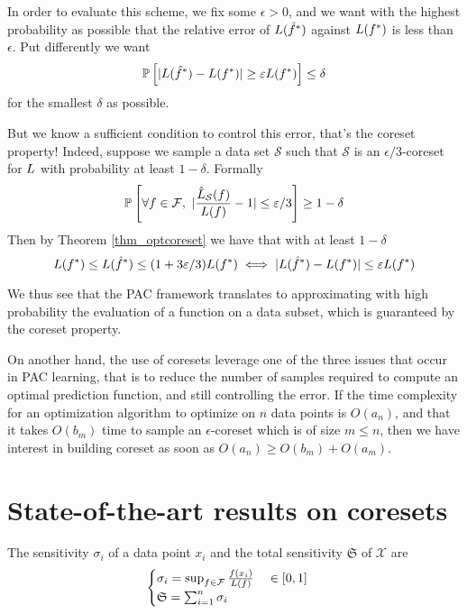 In order to evaluate this scheme, we fix some $\epsilon>0$, and we want with the highest probability as possible that the relative error of $L(\hat {f}^*)$ against $L(f^*)$ is less than $\epsilon$. Put differently we want
\begin{equation*}
	\mathbb{P}\left[|L(\hat {f}^*) - L(f^*)| \ge \varepsilon L(f^*)\right] \leq \delta
\end{equation*}
for the smallest $\delta$ as possible.

But we know a sufficient condition to control this error, that's the coreset property! Indeed, suppose we sample a data set $\mathcal{S}$ such that $\mathcal{S}$ is an $\epsilon/3$-coreset for $L$ with probability at least $1-\delta$. Formally
\begin{equation*}
    \PPP{}{\forall f \in \queryset,\ |\frac{\estloss{\mathcal{S}}(\query)}{\loss(\query)} - 1| \leq \epsilon/3} \geq 1- \delta
\end{equation*}
Then by Theorem \ref{thm_optcoreset} we have that with at least $1-\delta$
\begin{equation*}
    L(f^*) \leq L(\hat {f}^*) \leq (1+ 3 \varepsilon/3) L(f^*) \iff
    |L(\hat {f}^*) - L(f^*)| \leq \varepsilon L(f^*)
\end{equation*}

We thus see that the PAC framework translates to approximating with high probability the evaluation of a function on a data subset, which is guaranteed by the coreset property. 

On another hand, the use of coresets leverage one of the three issues that occur in PAC learning, that is to reduce the number of samples required to compute an optimal prediction function, and still controlling the error. If the time complexity for an optimization algorithm to optimize on $n$ data points is $O(a_n)$, and that it takes $O(b_m)$ time to sample an $\epsilon$-coreset which is of size $m \le n$, then we have interest in building coreset as soon as $O(a_n) \geq O(b_m) + O(a_m)$.







\section{State-of-the-art results on coresets}
\begin{definition}[Sensitivity]
	The sensitivity $\sigma_i$ of a data point $x_{i}$ and the total sensitivity $\mathfrak S$ of $\mathcal X$ are
	$$
	\begin{cases}
		\sigma_{i}= \sup _{f \in \mathcal{F}} \frac{{f}\left(x_{i}\right)}{L(f)} \quad \in[0,1]\\
		\mathfrak{S}=\sum_{i=1}^{n} \sigma_{i}
	\end{cases}
	$$
\end{definition} 

